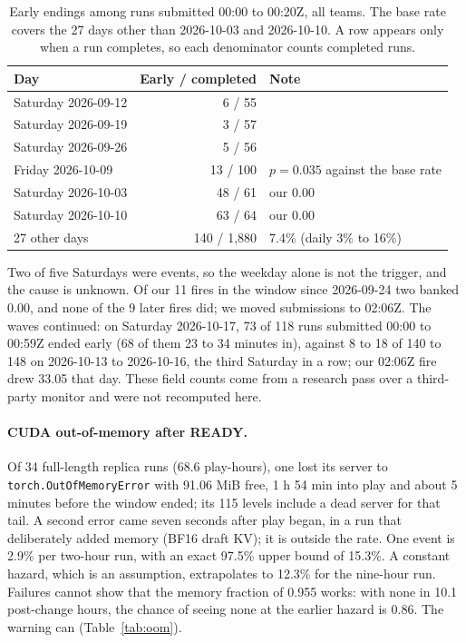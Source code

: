 \begin{table}[!htb]
\caption{Early endings among runs submitted 00:00 to 00:20Z, all teams. The base rate covers the 27 days other than 2026-10-03 and 2026-10-10. A row appears only when a run completes, so each denominator counts completed runs.}\label{tab:wave}
\centering\footnotesize
\begin{tabular}{@{}lrl@{}}
\toprule
Day & Early / completed & Note \\
\midrule
Saturday 2026-09-12 & 6 / 55 & \\ %
Saturday 2026-09-19 & 3 / 57 & \\ %
Saturday 2026-09-26 & 5 / 56 & \\ %
Friday 2026-10-09 & 13 / 100 & $p=0.035$ against the base rate \\ %
Saturday 2026-10-03 & 48 / 61 & our 0.00 \\ %
Saturday 2026-10-10 & 63 / 64 & our 0.00 \\ %
27 other days & 140 / 1,880 & 7.4\% (daily 3\% to 16\%) \\ %
\bottomrule
\end{tabular}
\end{table}

Two of five Saturdays were events, so the weekday alone is not the trigger, and the cause is unknown. %
Of our 11 fires in the window since 2026-09-24 two banked 0.00, and none of the 9 later fires did; we moved submissions to 02:06Z. %
The waves continued: on Saturday 2026-10-17, 73 of 118 runs submitted 00:00 to 00:59Z ended early (68 of them 23 to 34 minutes in), against 8 to 18 of 140 to 148 on 2026-10-13 to 2026-10-16, the third Saturday in a row; our 02:06Z fire drew 33.05 that day. %
These field counts come from a research pass over a third-party monitor and were not recomputed here. %

\paragraph{CUDA out-of-memory after READY.}
Of 34 full-length replica runs (68.6 play-hours), one lost its server to \texttt{torch.OutOfMemoryError} with 91.06 MiB free, 1 h 54 min into play and about 5 minutes before the window ended; its 115 levels include a dead server for that tail. %
A second error came seven seconds after play began, in a run that deliberately added memory (BF16 draft KV); it is outside the rate. %
One event is 2.9\% per two-hour run, with an exact 97.5\% upper bound of 15.3\%. A constant hazard, which is an assumption, extrapolates to 12.3\% for the nine-hour run. %
Failures cannot show that the memory fraction of 0.955 works: with none in 10.1 post-change hours, the chance of seeing none at the earlier hazard is 0.86. The warning can (Table~\ref{tab:oom}). %


